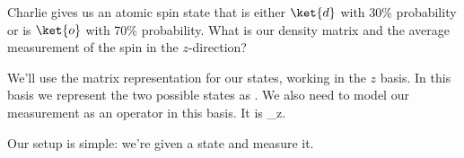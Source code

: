 \begin{example}
Charlie gives us an atomic spin state that is either $\ket{d}$ with 30\% probability or is $\ket{o}$ with 70\% probability. What is our density matrix and the average measurement of the spin in the $z$-direction?

\model We'll use the matrix representation for our states, working in the $z$ basis. In this basis we represent the two possible states as 
\beq
{}\Meq {}\qquad{}\Meq {}.
\eeq
We also need to model our measurement as an operator in this basis. It is
\beq
{}_z\Meq {}\szmatrix.
\eeq

\vis Our setup is simple: we're given a state and measure it.
\begin{figure}
\centering
{}
\end{figure}


\end{example}
